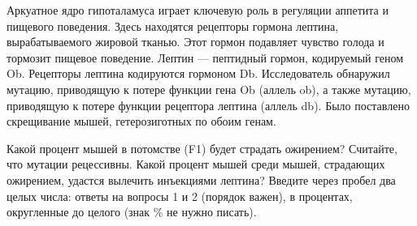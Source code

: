 
Аркуатное ядро гипоталамуса играет ключевую роль в регуляции аппетита и пищевого поведения. Здесь находятся рецепторы гормона лептина, вырабатываемого жировой тканью. Этот гормон подавляет чувство голода и тормозит пищевое поведение. Лептин — пептидный гормон, кодируемый геном Ob. Рецепторы лептина кодируются гормоном Db. Исследователь обнаружил мутацию, приводящую к потере функции гена Ob (аллель ob), а также мутацию, приводящую к потере функции рецептора лептина (аллель db). Было поставлено скрещивание мышей, гетерозиготных по обоим генам.

Какой процент мышей в потомстве (F1) будет страдать ожирением? Считайте, что мутации рецессивны.
Какой процент мышей среди мышей, страдающих ожирением, удастся вылечить инъекциями лептина?
Введите через пробел два целых числа: ответы на вопросы 1 и 2 (порядок важен), в процентах, округленные до целого (знак \% не нужно писать).